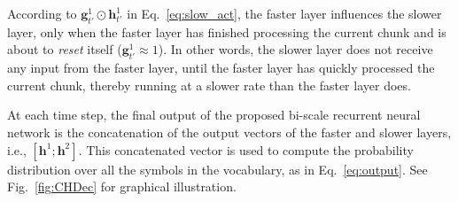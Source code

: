 \documentclass[11pt]{article}
\newcommand{\vect}[1]{\mathbf{#1}}
\newcommand{\vh}[0]{\vect{h}}
\newcommand{\vg}[0]{\vect{g}}
\begin{document}
According to $\vg^1_{t'}\odot\vh^1_{t'}$ in Eq.~\eqref{eq:slow_act}, the faster layer
influences the slower layer, only when the faster layer has finished processing
the current chunk and is about to {\em reset} itself ($\vg^1_{t'} \approx 1$).
In other words, the slower layer does not receive any input from the faster
layer, until the faster layer has quickly processed the current chunk, thereby
running at a slower rate than the faster layer does.

At each time step, the final output of the proposed bi-scale recurrent neural
network is the concatenation of the output vectors of the faster and slower
layers, i.e., $\left[ \vh^1; \vh^2 \right]$. This concatenated vector is used to
compute the probability distribution over all the symbols in the vocabulary, as
in Eq.~\eqref{eq:output}.  See Fig.~\ref{fig:CHDec} for graphical illustration.
\end{document}
